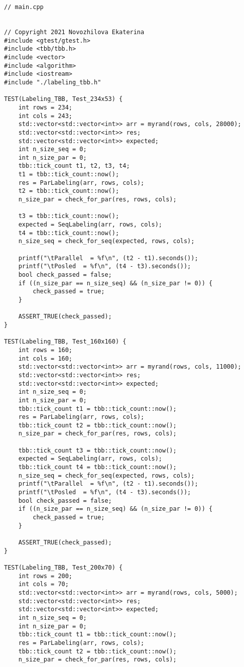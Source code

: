 \documentclass{report}
\begin{document}
\begin{lstlisting}
// main.cpp


// Copyright 2021 Novozhilova Ekaterina
#include <gtest/gtest.h>
#include <tbb/tbb.h>
#include <vector>
#include <algorithm>
#include <iostream>
#include "./labeling_tbb.h"

TEST(Labeling_TBB, Test_234x53) {
    int rows = 234;
    int cols = 243;
    std::vector<std::vector<int>> arr = myrand(rows, cols, 28000);
    std::vector<std::vector<int>> res;
    std::vector<std::vector<int>> expected;
    int n_size_seq = 0;
    int n_size_par = 0;
    tbb::tick_count t1, t2, t3, t4;
    t1 = tbb::tick_count::now();
    res = ParLabeling(arr, rows, cols);
    t2 = tbb::tick_count::now();
    n_size_par = check_for_par(res, rows, cols);

    t3 = tbb::tick_count::now();
    expected = SeqLabeling(arr, rows, cols);
    t4 = tbb::tick_count::now();
    n_size_seq = check_for_seq(expected, rows, cols);

    printf("\tParallel  = %f\n", (t2 - t1).seconds());
    printf("\tPosled  = %f\n", (t4 - t3).seconds());
    bool check_passed = false;
    if ((n_size_par == n_size_seq) && (n_size_par != 0)) {
        check_passed = true;
    }

    ASSERT_TRUE(check_passed);
}

TEST(Labeling_TBB, Test_160x160) {
    int rows = 160;
    int cols = 160;
    std::vector<std::vector<int>> arr = myrand(rows, cols, 11000);
    std::vector<std::vector<int>> res;
    std::vector<std::vector<int>> expected;
    int n_size_seq = 0;
    int n_size_par = 0;
    tbb::tick_count t1 = tbb::tick_count::now();
    res = ParLabeling(arr, rows, cols);
    tbb::tick_count t2 = tbb::tick_count::now();
    n_size_par = check_for_par(res, rows, cols);

    tbb::tick_count t3 = tbb::tick_count::now();
    expected = SeqLabeling(arr, rows, cols);
    tbb::tick_count t4 = tbb::tick_count::now();
    n_size_seq = check_for_seq(expected, rows, cols);
    printf("\tParallel  = %f\n", (t2 - t1).seconds());
    printf("\tPosled  = %f\n", (t4 - t3).seconds());
    bool check_passed = false;
    if ((n_size_par == n_size_seq) && (n_size_par != 0)) {
        check_passed = true;
    }

    ASSERT_TRUE(check_passed);
}

TEST(Labeling_TBB, Test_200x70) {
    int rows = 200;
    int cols = 70;
    std::vector<std::vector<int>> arr = myrand(rows, cols, 5000);
    std::vector<std::vector<int>> res;
    std::vector<std::vector<int>> expected;
    int n_size_seq = 0;
    int n_size_par = 0;
    tbb::tick_count t1 = tbb::tick_count::now();
    res = ParLabeling(arr, rows, cols);
    tbb::tick_count t2 = tbb::tick_count::now();
    n_size_par = check_for_par(res, rows, cols);


\end{lstlisting}
\end{document}
